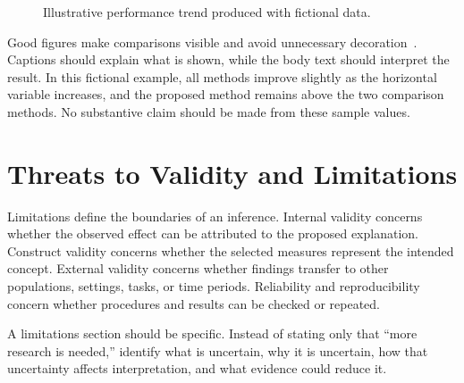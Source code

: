 \begin{figure}[ht]
\centering
{}
\caption{Illustrative performance trend produced with fictional data.}
\label{fig:performance-plot}
\end{figure}

Good figures make comparisons visible and avoid unnecessary decoration~\cite{tufte2001visual}. Captions should explain what is shown, while the body text should interpret the result. In this fictional example, all methods improve slightly as the horizontal variable increases, and the proposed method remains above the two comparison methods. No substantive claim should be made from these sample values.

\section{Threats to Validity and Limitations}

Limitations define the boundaries of an inference. Internal validity concerns whether the observed effect can be attributed to the proposed explanation. Construct validity concerns whether the selected measures represent the intended concept. External validity concerns whether findings transfer to other populations, settings, tasks, or time periods. Reliability and reproducibility concern whether procedures and results can be checked or repeated.

A limitations section should be specific. Instead of stating only that ``more research is needed,'' identify what is uncertain, why it is uncertain, how that uncertainty affects interpretation, and what evidence could reduce it.

